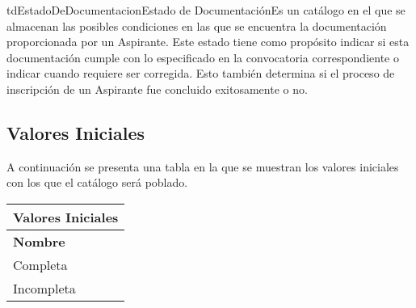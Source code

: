 \begin{TipoDeDato}{tdEstadoDeDocumentacion}{Estado de Documentación}{Es un catálogo en el que se almacenan las posibles condiciones en las que se encuentra la documentación proporcionada por un Aspirante. Este estado tiene como propósito indicar si esta documentación cumple con lo especificado en la convocatoria correspondiente o indicar cuando requiere ser corregida. Esto también determina si el proceso de inscripción de un Aspirante fue concluido exitosamente o no.}

	\begin{tdAtributos}
	\end{tdAtributos}
	
	\subsection{Valores Iniciales}
	 A continuación se presenta una tabla en la que se muestran los valores iniciales con los que el catálogo será poblado. \cdtEmpty
		\begin{longtable}{|p{}|}
				\hline
				\rowcolor{colorPrincipal}
	 			\bf \color{white} Valores Iniciales\\
	 			\hline
	 			\rowcolor{colorSecundario}
	 			\bf\color{white}Nombre \\
	 			\hline
	 				 Completa \\
	 				 \hline
	 				 Incompleta \\
	 			\hline
		\end{longtable}
\end{TipoDeDato}

